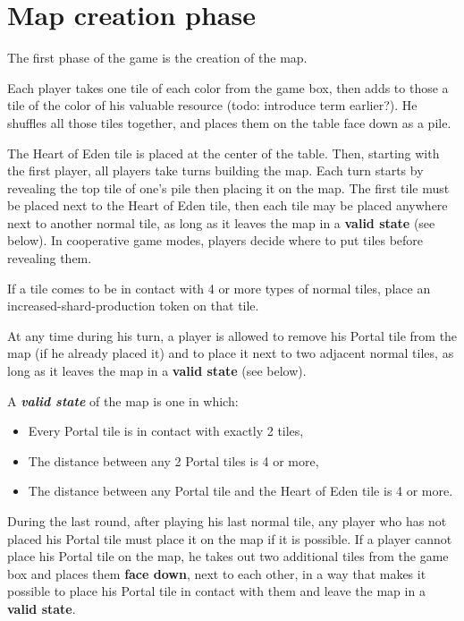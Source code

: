 \documentclass[a4paper]{article}
\begin{document}
\newpage
\section{Map creation phase}

    The first phase of the game is the creation of the map.
    
    Each player takes one tile of each color from the game box,
    then adds to those a tile of the color of his valuable resource
    (todo: introduce term earlier?).
    He shuffles all those tiles together,
    and places them on the table face down as a pile.
    
    The Heart of Eden tile is placed at the center of the table.
    Then, starting with the first player, all players take turns building the map.
    Each turn starts by revealing the top tile of one's pile then placing it on the map.
    The first tile must be placed next to the Heart of Eden tile,
    then each tile may be placed anywhere next to another normal tile,
    as long as it leaves the map in a \textbf{valid state} (see below).
    In cooperative game modes, players decide where to put tiles before revealing them.
    
    If a tile comes to be in contact with 4 or more types of normal tiles,
    place an increased-shard-production token on that tile.
    
    At any time during his turn, a player is allowed to remove his Portal tile
    from the map (if he already placed it) and to place it next to two
    adjacent normal tiles, as long as it leaves the map in a
    \textbf{valid state} (see below).  
    
    A \textbf{\textit{valid state}} of the map is one in which:
    \vspace{-1.3em}
    \begin{itemize}
        \item Every Portal tile is in contact with exactly 2 tiles,
        \item The distance between any 2 Portal tiles is 4 or more,
        \item The distance between any Portal tile and the Heart of Eden tile
        is 4 or more.
    \end{itemize}
    
    \vspace{-0.7em}
    During the last round, after playing his last normal tile,
    any player who has not placed his Portal tile must place it on the map
    if it is possible.
    If a player cannot place his Portal tile on the map,
    he takes out two additional tiles from the game box
    and places them \textbf{face down}, next to each other,
    in a way that makes it possible to place his Portal tile in contact with them
    and leave the map in a \textbf{valid state}.
    
\end{document}
